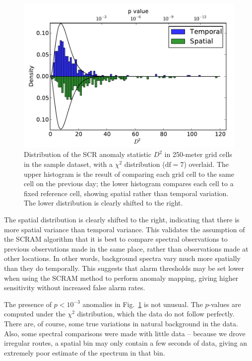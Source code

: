 \begin{figure}
  \centering
  \includegraphics[width=\textwidth]{figures/scr-distributions.pdf}
  \caption{Distribution of the SCR anomaly statistic \(D^2\) in 250-meter grid
    cells in the sample dataset, with a \(\chi^2\) distribution (\(\text{df} =
    7\)) overlaid. The upper histogram is the result of comparing each grid cell
    to the same cell on the previous day; the lower histogram compares each cell
    to a fixed reference cell, showing spatial rather than temporal
    variation. The lower distribution is clearly shifted to the right.}
  \label{scr-distribution}
\end{figure}

The spatial distribution is clearly shifted to the right, indicating that there
is more spatial variance than temporal variance. This validates the assumption
of the SCRAM algorithm that it is best to compare spectral observations to
previous observations made in the same place, rather than observations made at
other locations. In other words, background spectra vary much more spatially
than they do temporally. This suggests that alarm thresholds may be set lower
when using the SCRAM method to perform anomaly mapping, giving higher
sensitivity without increased false alarm rates.

The presence of \(p < 10^{-3}\) anomalies in Fig.~\ref{scr-distribution} is not
unusual. The \(p\)-values are computed under the \(\chi^2\) distribution, which
the data do not follow perfectly. There are, of course, some true variations in
natural background in the data. Also, some spectral comparisons were made with
little data -- because we drove irregular routes, a spatial bin may only contain
a few seconds of data, giving an extremely poor estimate of the spectrum in that
bin.

